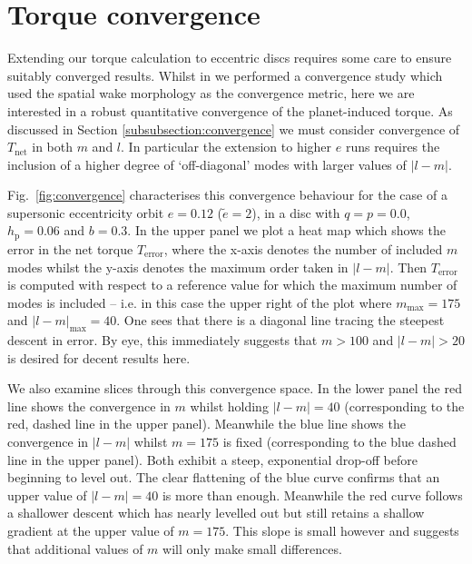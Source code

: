 \section{Torque convergence}
\label{app:torque_converegence}

Extending our torque calculation to eccentric discs requires some care to ensure suitably converged results. Whilst in  we performed a convergence study which used the spatial wake morphology as the convergence metric, here we are interested in a robust quantitative convergence of the planet-induced torque. As discussed in Section \ref{subsubsection:convergence} we must consider convergence of $T_\textrm{net}$ in both $m$ and $l$. In particular the extension to higher $e$ runs requires the inclusion of a higher degree of `off-diagonal' modes with larger values of $|l-m|$. 

Fig.~\ref{fig:convergence} characterises this convergence behaviour for the case of a supersonic eccentricity orbit $e=0.12$ ($\tilde e=2$), in a disc with $q=p=0.0$, $h_\textrm{p}=0.06$ and $b=0.3$. In the upper panel we plot a heat map which shows the error in the net torque $T_\textrm{error}$, where the x-axis denotes the number of included $m$ modes whilst the y-axis denotes the maximum order taken in $|l-m|$. Then $T_\textrm{error}$ is computed with respect to a reference value for which the maximum number of modes is included -- i.e. in this case the upper right of the plot where $m_\textrm{max}=175$ and $|l-m|_\textrm{max}=40$. One sees that there is a diagonal line tracing the steepest descent in error. By eye, this immediately suggests that $m > 100$ and $|l-m|>20$ is desired for decent results here. 

We also examine slices through this convergence space. In the lower panel the red line shows the convergence in $m$ whilst holding $|l-m|=40$ (corresponding to the red, dashed line in the upper panel). Meanwhile the blue line shows the convergence in $|l-m|$ whilst $m=175$ is fixed (corresponding to the blue dashed line in the upper panel). Both exhibit a steep, exponential drop-off before beginning to level out. The clear flattening of the blue curve confirms that an upper value of $|l-m| = 40$ is more than enough. Meanwhile the red curve follows a shallower descent which has nearly levelled out but still retains a shallow gradient at the upper value of $m=175$. This slope is small however and suggests that additional values of $m$ will only make small differences. 

